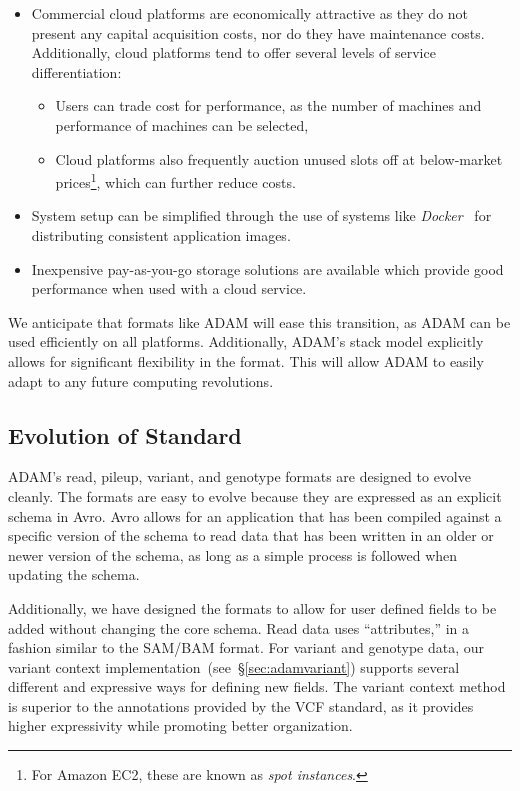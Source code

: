 \documentclass{bioinfo}
\begin{document}
\begin{itemize}
\item Commercial cloud platforms are economically attractive as they do not present any capital acquisition costs, nor do they have maintenance costs. Additionally, cloud
platforms tend to offer several levels of service differentiation:
\begin{itemize}
\item Users can trade cost for performance, as the number of machines and performance of machines can be selected,
\item Cloud platforms also frequently auction unused slots off at below-market prices\footnote{For Amazon EC2, these are known as \emph{spot instances}.}, which can
further reduce costs.
\end{itemize}
\item System setup can be simplified through the use of systems like \textit{Docker}~\citep{docker} for distributing consistent application images.
\item Inexpensive pay-as-you-go storage solutions are available which provide good performance when used with a cloud service.
\end{itemize}

We anticipate that formats like ADAM will ease this transition, as ADAM can be used efficiently on all platforms. Additionally, ADAM's stack model explicitly allows for significant
flexibility in the format. This will allow ADAM to easily adapt to any future computing revolutions.

\subsection{Evolution of Standard}
\label{sec:evolution-of-standard}

ADAM's read, pileup, variant, and genotype formats are designed to evolve cleanly. The formats are easy to evolve because they are expressed as an explicit schema
in Avro. Avro allows for an application that has been compiled against a specific version of the schema to read data that has been written in an older or newer version of the
schema, as long as a simple process is followed when updating the schema.

Additionally, we have designed the formats to allow for user defined fields to be added without changing the core schema. Read data uses ``attributes,'' in a fashion similar to
the SAM/BAM format. For variant and genotype data, our variant context implementation~(see~\S\ref{sec:adamvariant}) supports several different and expressive ways for
defining new fields. The variant context method is superior to the annotations provided by the VCF standard, as it provides higher expressivity while promoting better
organization.
\end{document}
